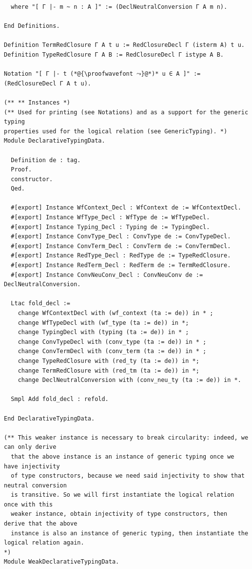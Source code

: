 \begin{lstlisting}
  where "[ Γ |- m ~ n : A ]" := (DeclNeutralConversion Γ A m n).

End Definitions.

Definition TermRedClosure Γ A t u := RedClosureDecl Γ (isterm A) t u.
Definition TypeRedClosure Γ A B := RedClosureDecl Γ istype A B.

Notation "[ Γ |- t (*@{\proofwavefont ⤳}@*)* u ∈ A ]" := (RedClosureDecl Γ A t u).

(** ** Instances *)
(** Used for printing (see Notations) and as a support for the generic typing
properties used for the logical relation (see GenericTyping). *)
Module DeclarativeTypingData.

  Definition de : tag.
  Proof.
  constructor.
  Qed.

  #[export] Instance WfContext_Decl : WfContext de := WfContextDecl.
  #[export] Instance WfType_Decl : WfType de := WfTypeDecl.
  #[export] Instance Typing_Decl : Typing de := TypingDecl.
  #[export] Instance ConvType_Decl : ConvType de := ConvTypeDecl.
  #[export] Instance ConvTerm_Decl : ConvTerm de := ConvTermDecl.
  #[export] Instance RedType_Decl : RedType de := TypeRedClosure.
  #[export] Instance RedTerm_Decl : RedTerm de := TermRedClosure.
  #[export] Instance ConvNeuConv_Decl : ConvNeuConv de := DeclNeutralConversion.

  Ltac fold_decl :=
    change WfContextDecl with (wf_context (ta := de)) in * ;
    change WfTypeDecl with (wf_type (ta := de)) in *;
    change TypingDecl with (typing (ta := de)) in * ;
    change ConvTypeDecl with (conv_type (ta := de)) in * ;
    change ConvTermDecl with (conv_term (ta := de)) in * ;
    change TypeRedClosure with (red_ty (ta := de)) in *;
    change TermRedClosure with (red_tm (ta := de)) in *;
    change DeclNeutralConversion with (conv_neu_ty (ta := de)) in *.

  Smpl Add fold_decl : refold.

End DeclarativeTypingData.

(** This weaker instance is necessary to break circularity: indeed, we can only derive
  that the above instance is an instance of generic typing once we have injectivity
  of type constructors, because we need said injectivity to show that neutral conversion
  is transitive. So we will first instantiate the logical relation once with this
  weaker instance, obtain injectivity of type constructors, then derive that the above
  instance is also an instance of generic typing, then instantiate the logical relation again.
*)
Module WeakDeclarativeTypingData.


\end{lstlisting}
